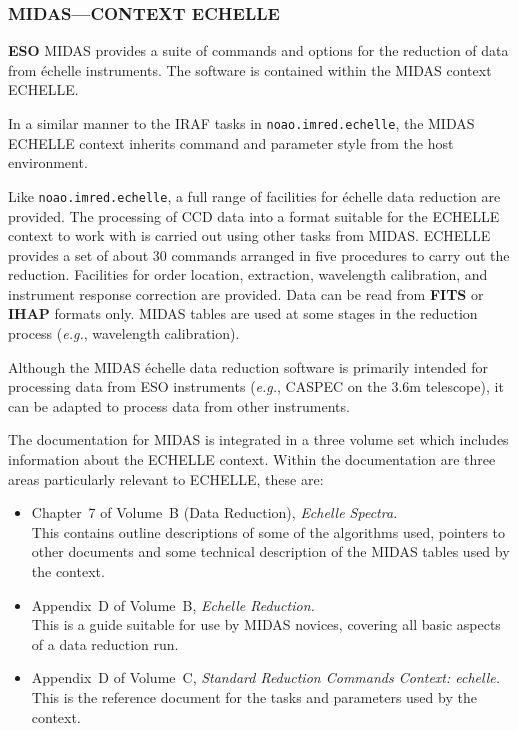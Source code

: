 \documentclass[twoside,11pt]{article}
\newcommand{\htmladdnormallink}[2]{#1}
\newcommand{\htmlref}[2]{#1}
\newcommand{\xlabel}[1]{}
\newcommand{\sgspec}[2]{#1}
\newcommand{\sgspec}[2]{#2}
\begin{document}
\subsubsection{\xlabel{midas_ech}\label{se_midas_ech}MIDAS\sgspec{---}{ - }CONTEXT ECHELLE}

\htmlref{{\bf ESO}}{gl_eso} MIDAS provides a suite of commands and
options for the reduction of data from \'{e}chelle instruments.
The software is contained within the MIDAS context ECHELLE\@.

In a similar manner to the IRAF tasks in {\tt noao.imred.echelle},
the MIDAS ECHELLE context inherits command and parameter style from
the host environment.

Like {\tt noao.imred.echelle}, a full range of facilities for \'{e}chelle
data reduction are provided.  The processing of CCD data into a format
suitable for the ECHELLE context to work with is carried out using other
tasks from MIDAS\@.  ECHELLE provides a set of about 30 commands arranged
in five procedures to carry out the reduction.  Facilities for order
location, extraction, wavelength calibration, and instrument response
correction are provided.  Data can be read from
\htmlref{{\bf FITS}}{gl_fits} or \htmlref{{\bf IHAP}}{gl_ihap} formats only.
MIDAS tables are used at some stages in the reduction process
({\em{e.g.}}, wavelength calibration).

Although the MIDAS \'{e}chelle data reduction software is primarily intended
for processing data from ESO instruments ({\em{e.g.}}, CASPEC on the 3.6m
telescope), it can be adapted to process data from other instruments.

The documentation for MIDAS is integrated in a three volume set which
includes information about the ECHELLE context.  Within the documentation
are three areas particularly relevant to ECHELLE, these are:

\begin{itemize}

\item \htmladdnormallink{Chapter~7 of Volume~B (Data Reduction),
      {\sl Echelle Spectra.}}
      {http://http.hq.eso.org/midas-info/doc/95NOV/vol2/node146.html}\\
      This contains outline descriptions of some of the algorithms used,
      pointers to other documents and some technical description of the
      MIDAS tables used by the context.

\item \htmladdnormallink{Appendix~D of Volume~B, {\sl Echelle Reduction.}}
      {http://http.hq.eso.org/midas-info/doc/95NOV/vol2/node456.html}\\
      This is a guide suitable for use by MIDAS novices, covering all
      basic aspects of a data reduction run.

\item Appendix~D of Volume~C, {\sl Standard Reduction Commands Context:
      echelle.}\\
      This is the reference document for the tasks and parameters used
      by the context.

\end{itemize}
\end{document}
